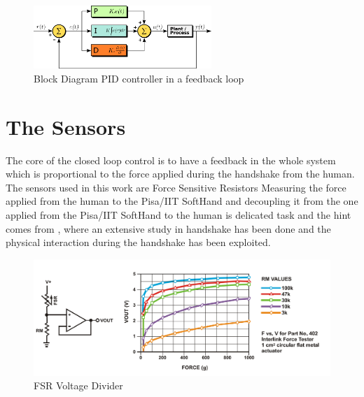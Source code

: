 \begin{figure}[h]
\centering
\includegraphics[width=0.6\textwidth]{Figure/PID.png}
\caption{Block Diagram PID controller in a feedback loop}
\label{Fig:PID}
\end{figure}

\section{The Sensors}
The core of the closed loop control is to have a feedback in the whole system which is proportional to the force applied during the handshake from the human. 
The sensors used in this work are Force Sensitive Resistors 
Measuring the force applied from the human to the Pisa/IIT SoftHand and decoupling it from the one applied from the Pisa/IIT SoftHand to the human is delicated task and the hint comes from \cite{espen}, where an extensive study in handshake has been done and the physical interaction during the handshake has been exploited.
\begin{figure}[ht]
\centering
\includegraphics[width=\textwidth]{Figure/fsr.png}
\caption{FSR Voltage Divider}
\label{Fig:FSRcircuit}
\end{figure}


